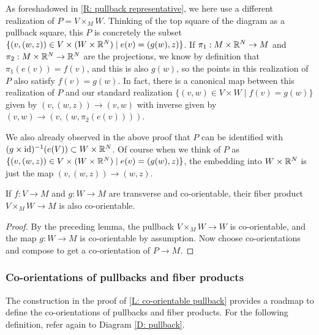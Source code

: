 \begin{remark}\label{R: pullback representative 2}
	As foreshadowed in \cref{R: pullback representative}, we here use a different realization of $P=V\times_MW$.
	Thinking of the top square of the diagram as a pullback square, this $P$ is concretely the subset $\{(v,(w,z))\in V\times (W\times \mathbb{R}^N)\mid e(v)=(g(w),z)\}$.
	If $\pi_1:M\times \mathbb{R}^N\to M$ and $\pi_2:M\times \mathbb{R}^N\to \mathbb{R}^N$ are the projections, we know by definition that $\pi_1(e(v))=f(v)$, and this is also $g(w)$, so the points in this realization of $P$ also satisfy $f(v)=g(w)$.
	In fact, there is a canonical map between this realization of $P$ and our standard realization $\{(v,w)\in V\times W\mid f(v)=g(w)\}$ given by $(v,(w,z))\to (v,w)$ with inverse given by $(v,w)\to (v,(w,\pi_2(e(v))))$.

	We also already observed in the above proof that $P$ can be identified with $(g\times \mathrm{id})^{-1}(e(V))\subset W\times \mathbb{R}^N$.
	Of course when we think of $P$ as $\{(v,(w,z))\in V\times (W\times \mathbb{R}^N)\mid e(v)=(g(w),z)\}$, the embedding into $W\times \mathbb{R}^N$ is just the map $(v,(w,z))\to (w,z)$.
\end{remark}

\begin{corollary}
	If $f:V\to M$ and $g:W\to M$ are transverse and co-orientable, their fiber product $V\times_MW \to M$ is also co-orientable.
\end{corollary}

\begin{proof}
	By the preceding lemma, the pullback $V\times_MW\to W$ is co-orientable, and the map $g:W\to M$ is co-orientable by assumption.
	Now choose co-orientations and compose to get a co-orientation of $P\to M$.
\end{proof}

\subsubsection{Co-orientations of pullbacks and fiber products}\label{S: co-orientation of pullbacks}

The construction in the proof of \cref{L: co-orientable pullback} provides a roadmap to define the co-orientations of pullbacks and fiber products.
For the following definition, refer again to Diagram \eqref{D: pullback}.

